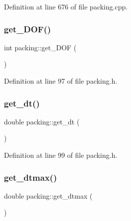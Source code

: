 Definition at line 676 of file packing.\+cpp.

\mbox{\label{classpacking_a0b60c2368d6b16389edfdb81bd0f45b7}} 
\subsubsection{\texorpdfstring{get\+\_\+\+D\+O\+F()}{get\_DOF()}}
{\footnotesize\ttfamily int packing\+::get\+\_\+\+D\+OF (\begin{DoxyParamCaption}{ }\end{DoxyParamCaption})\hspace{0.3cm}{\ttfamily [inline]}}



Definition at line 97 of file packing.\+h.

\mbox{\label{classpacking_a778812fa17eb4daa96adc03f1ce5128c}} 
\subsubsection{\texorpdfstring{get\+\_\+dt()}{get\_dt()}}
{\footnotesize\ttfamily double packing\+::get\+\_\+dt (\begin{DoxyParamCaption}{ }\end{DoxyParamCaption})\hspace{0.3cm}{\ttfamily [inline]}}



Definition at line 99 of file packing.\+h.

\mbox{\label{classpacking_a36de243c3a970bbf0840a17bf9758e61}} 
\subsubsection{\texorpdfstring{get\+\_\+dtmax()}{get\_dtmax()}}
{\footnotesize\ttfamily double packing\+::get\+\_\+dtmax (\begin{DoxyParamCaption}{ }\end{DoxyParamCaption})\hspace{0.3cm}{\ttfamily [inline]}}



